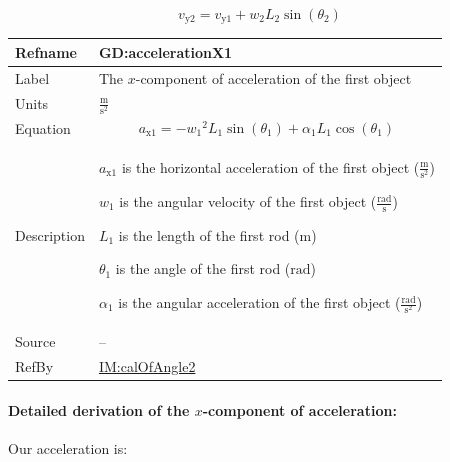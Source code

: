 \documentclass[12pt]{article}
\begin{document}
\begin{displaymath}
{v_{\text{y}2}}={v_{\text{y}1}}+{w_{2}} {L_{2}} \sin\left({θ_{2}}\right)
\end{displaymath}
\vspace{\baselineskip}
\noindent
\begin{minipage}{\textwidth}
\begin{tabular}{>{\raggedright}p{}>{\raggedright\arraybackslash}p{}}
\toprule \textbf{Refname} & \textbf{GD:accelerationX1}
\label{GD:accelerationX1}
\\ \midrule
Label & The $x$-component of acceleration of the first object
        
\\ \midrule
Units & $\frac{\text{m}}{\text{s}^{2}}$
        
\\ \midrule
Equation & \begin{displaymath}
           {a_{\text{x}1}}=-{w_{1}}^{2} {L_{1}} \sin\left({θ_{1}}\right)+{α_{1}} {L_{1}} \cos\left({θ_{1}}\right)
           \end{displaymath}
\\ \midrule
Description & \begin{symbDescription}
              \item{${a_{\text{x}1}}$ is the horizontal acceleration of the first object ($\frac{\text{m}}{\text{s}^{2}}$)}
              \item{${w_{1}}$ is the angular velocity of the first object ($\frac{\text{rad}}{\text{s}}$)}
              \item{${L_{1}}$ is the length of the first rod (${\text{m}}$)}
              \item{${θ_{1}}$ is the angle of the first rod (${\text{rad}}$)}
              \item{${α_{1}}$ is the angular acceleration of the first object ($\frac{\text{rad}}{\text{s}^{2}}$)}
              \end{symbDescription}
\\ \midrule
Source & --
         
\\ \midrule
RefBy & \hyperref[IM:calOfAngle2]{IM:calOfAngle2}
        
\\ \bottomrule
\end{tabular}
\end{minipage}
\paragraph{Detailed derivation of the $x$-component of acceleration:}
\label{GD:accelerationX1Deriv}
Our acceleration is:
\end{document}
